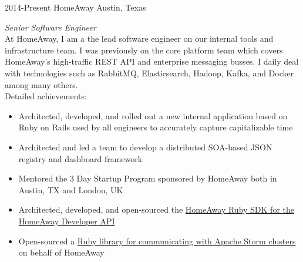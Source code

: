 \documentclass{friggeri-cv} %
\begin{document}
\begin{entrylist}
\entry
{2014-Present}
{HomeAway}
{Austin, Texas}
{\emph{Senior Software Engineer} \\
At HomeAway, I am a the lead software engineer on our internal tools and infrastructure team. I was previously on the core platform team which covers HomeAway's high-traffic REST API and enterprise messaging busses. I daily deal with technologies such as RabbitMQ, Elasticsearch, Hadoop, Kafka, and Docker among many others. \\
Detailed achievements:
\begin{itemize}
\item Architected, developed, and rolled out a new internal application based on Ruby on Rails used by all engineers to accurately capture capitalizable time
\item Architected and led a team to develop a distributed SOA-based JSON registry and dashboard framework
\item Mentored the 3 Day Startup Program sponsored by HomeAway both in Austin, TX and London, UK
\item Architected, developed, and open-sourced the \href{https://github.com/homeaway/homeaway_api_ruby}{HomeAway Ruby SDK for the HomeAway Developer API}
\item Open-sourced a \href{https://github.com/homeaway/homeaway-storm}{Ruby library for communicating with Apache Storm clusters} on behalf of HomeAway
\end{itemize}}
\end{entrylist}
\end{document}
